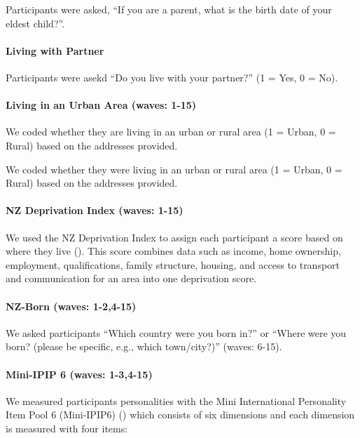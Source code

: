 \documentclass[
  singlecolumn]{article}
\let\oldparagraph\paragraph
\renewcommand{\paragraph}[1]{\oldparagraph{#1}\mbox{}}
\begin{document}
Participants were asked, ``If you are a parent, what is the birth date
of your eldest child?''.

\paragraph{Living with Partner}\label{living-with-partner}

Participants were asekd ``Do you live with your partner?'' (1 = Yes, 0 =
No).

\paragraph{Living in an Urban Area (waves:
1-15)}\label{living-in-an-urban-area-waves-1-15}

We coded whether they are living in an urban or rural area (1 = Urban, 0
= Rural) based on the addresses provided.

We coded whether they were living in an urban or rural area (1 = Urban,
0 = Rural) based on the addresses provided.

\paragraph{NZ Deprivation Index (waves:
1-15)}\label{nz-deprivation-index-waves-1-15}

We used the NZ Deprivation Index to assign each participant a score
based on where they live (). This score combines data such as income, home ownership,
employment, qualifications, family structure, housing, and access to
transport and communication for an area into one deprivation score.

\paragraph{NZ-Born (waves: 1-2,4-15)}\label{nz-born-waves-1-24-15}

We asked participants ``Which country were you born in?'' or ``Where
were you born? (please be specific, e.g., which town/city?)'' (waves:
6-15).

\paragraph{Mini-IPIP 6 (waves:
1-3,4-15)}\label{mini-ipip-6-waves-1-34-15}

We measured participants personalities with the Mini International
Personality Item Pool 6 (Mini-IPIP6) () which consists of six dimensions and each dimension
is measured with four items:
\end{document}
